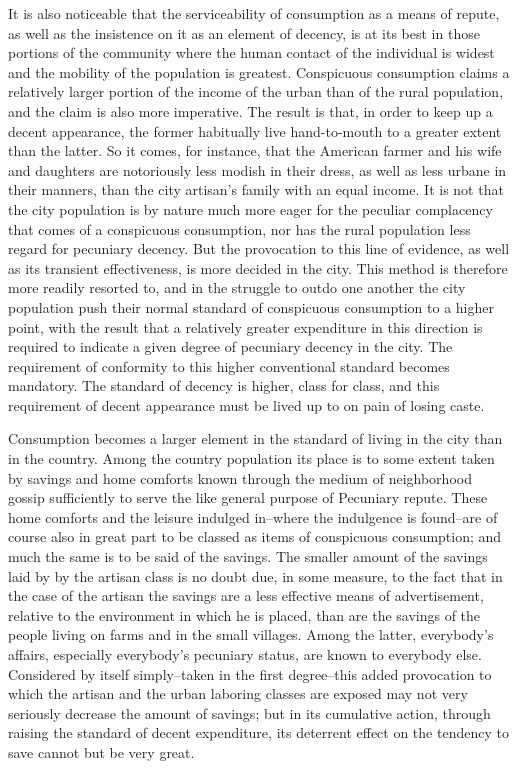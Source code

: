 \documentclass[12pt]{report}
\begin{document}
It is also noticeable that the serviceability of consumption as a means
of repute, as well as the insistence on it as an element of decency, is
at its best in those portions of the community where the human contact
of the individual is widest and the mobility of the population is
greatest. Conspicuous consumption claims a relatively larger portion of
the income of the urban than of the rural population, and the claim is
also more imperative. The result is that, in order to keep up a decent
appearance, the former habitually live hand-to-mouth to a greater extent
than the latter. So it comes, for instance, that the American farmer and
his wife and daughters are notoriously less modish in their dress, as
well as less urbane in their manners, than the city artisan's family
with an equal income. It is not that the city population is by nature
much more eager for the peculiar complacency that comes of a conspicuous
consumption, nor has the rural population less regard for pecuniary
decency. But the provocation to this line of evidence, as well as its
transient effectiveness, is more decided in the city. This method is
therefore more readily resorted to, and in the struggle to outdo one
another the city population push their normal standard of conspicuous
consumption to a higher point, with the result that a relatively greater
expenditure in this direction is required to indicate a given degree
of pecuniary decency in the city. The requirement of conformity to this
higher conventional standard becomes mandatory. The standard of decency
is higher, class for class, and this requirement of decent appearance
must be lived up to on pain of losing caste.

Consumption becomes a larger element in the standard of living in the
city than in the country. Among the country population its place is to
some extent taken by savings and home comforts known through the medium
of neighborhood gossip sufficiently to serve the like general purpose of
Pecuniary repute. These home comforts and the leisure indulged in--where
the indulgence is found--are of course also in great part to be classed
as items of conspicuous consumption; and much the same is to be said of
the savings. The smaller amount of the savings laid by by the artisan
class is no doubt due, in some measure, to the fact that in the case
of the artisan the savings are a less effective means of advertisement,
relative to the environment in which he is placed, than are the savings
of the people living on farms and in the small villages. Among the
latter, everybody's affairs, especially everybody's pecuniary status,
are known to everybody else. Considered by itself simply--taken in the
first degree--this added provocation to which the artisan and the urban
laboring classes are exposed may not very seriously decrease the amount
of savings; but in its cumulative action, through raising the standard
of decent expenditure, its deterrent effect on the tendency to save
cannot but be very great.
\end{document}
